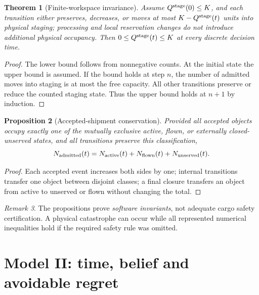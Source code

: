 \documentclass[10pt,a4paper]{article}
\newtheorem{theorem}{Theorem}[section]
\newtheorem{proposition}[theorem]{Proposition}
\theoremstyle{definition}\newtheorem{definition}[theorem]{Definition}
\theoremstyle{remark}\newtheorem{remark}[theorem]{Remark}
\newcommand{\1}{\mathbbm 1}
\begin{document}
\begin{theorem}[Finite-workspace invariance]\label{thm:stage}
Assume $Q^{\rm stage}(0)\le K$, and each transition either preserves, decreases, or moves at most $K-Q^{\rm stage}(t)$ units into physical staging; processing and local reservation changes do not introduce additional physical occupancy. Then $0\le Q^{\rm stage}(t)\le K$ at every discrete decision time.
\end{theorem}
\begin{proof}
The lower bound follows from nonnegative counts. At the initial state the upper bound is assumed. If the bound holds at step $n$, the number of admitted moves into staging is at most the free capacity. All other transitions preserve or reduce the counted staging state. Thus the upper bound holds at $n+1$ by induction.
\end{proof}

\begin{proposition}[Accepted-shipment conservation]\label{prop:conservation}
Provided all accepted objects occupy exactly one of the mutually exclusive active, flown, or externally closed-unserved states, and all transitions preserve this classification,
\begin{equation}N_{\rm admitted}(t)=N_{\rm active}(t)+N_{\rm flown}(t)+N_{\rm unserved}(t).\end{equation}
\end{proposition}
\begin{proof}Each accepted event increases both sides by one; internal transitions transfer one object between disjoint classes; a final closure transfers an object from active to unserved or flown without changing the total.\end{proof}
\begin{remark}The propositions prove \emph{software invariants}, not adequate cargo safety certification. A physical catastrophe can occur while all represented numerical inequalities hold if the required safety rule was omitted.\end{remark}

\section{Model II: time, belief and avoidable regret}
\end{document}
